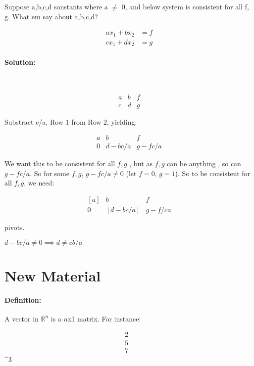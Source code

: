 \documentclass[11pt]{report}
\newcommand{\R}{\mathbb{R}}
\newenvironment{solution}{\paragraph{\small Solution:}}{\hfill}
\newenvironment{definition}{\paragraph{Definition:}}{\hfill}
\newenvironment{problem}[2][Problem]{\begin{trivlist}
   \item[\hskip \labelsep {\bfseries #1}\hskip \labelsep {\bfseries #2.}]}{\end{trivlist}}
\begin{document}
\begin{problem}{28}

	Suppose a,b,c,d sonstants where a $\neq$ 0, and below system is consistent for all f, g. What em say about a,b,c,d?
	
	\begin{align}
		ax_1 + bx_2&=f \\
		cx_1+dx_2&=g
	\end{align}
	
	\begin{solution}\
	
	\[\begin{matrix}{}
	  a & b &f \\
	  c& d&g 
	\end{matrix}\]


	Substract c/a, Row 1 from Row 2, yielding:
	
	\[\begin{matrix}{}
	  a & b &f \\
	  0 & d - bc/a &g -fc/a
	\end{matrix}\]

	
	We want this to be consistent for all $f,g$ , but as $f,g$ can be anything , so can $g-fc/a$. So for some $f,g$, $g-fc/a \neq 0$ (let $f=0$, $g = 1$). So to be consistent for all $f,g$, we need:
	
	\[\begin{matrix}{}
	  [a] & b& f \\
	  0 & [d-bc/a] & g- f/ca
	\end{matrix}\]
 
	
	pivots.

	\therefore $d-bc/a \neq 0 \implies d \neq cb/a$
		
	\end{solution}

\end{problem}


\section{New Material}

\begin{definition}
	A vector in $\R^n$ is a $n$x1 matrix. For instance: 
	
	\[\begin{matrix}{}
	  2&\\
	  5& \\
	  7&
	\end{matrix}\]
 \in \R^3
 
\end{definition}
\end{document}
